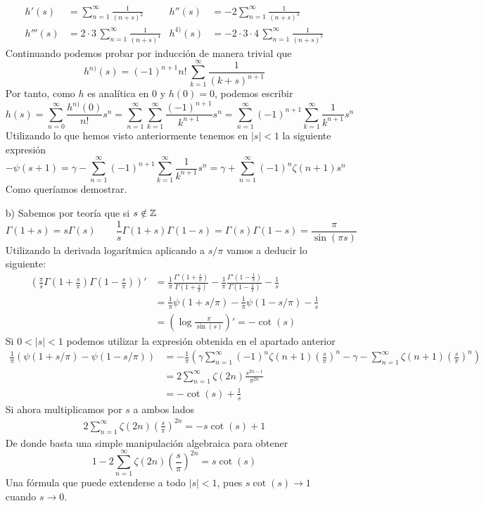 \documentclass[twoside]{article}
\begin{document}
\begin{sol}
\begin{itemize}
\begin{align*}
h'(s) & = \sum_{n=1}^\infty\frac{1}{(n+s)^2} & h''(s)&=  -2\sum_{n=1}^\infty\frac{1}{(n+s)^3}\\
h'''(s) &= 2 \cdot 3 \, \sum_{n=1}^\infty\frac{1}{(n+s)^4} &  h^{4)}(s) &= -2 \cdot 3 \cdot 4 \,\sum_{n=1}^\infty\frac{1}{(n+s)^5}
\end{align*}
Continuando podemos probar por inducción de manera trivial que
$$h^{n)}(s) = (-1)^{n+1}n!\,\sum_{k=1}^\infty\frac{1}{(k+s)^{n+1}}$$
Por tanto, como $h$ es analítica en $0$ y $h(0)=0$, podemos escribir
$$
h(s)=\sum_{n=0}^\infty \frac{h^{n)}(0)}{n!}s^n = \sum_{n=1}^\infty\sum_{k=1}^\infty\frac{(-1)^{n+1}}{k^{n+1}}  s^n = \sum_{n=1}^\infty(-1)^{n+1}\sum_{k=1}^\infty\frac{1}{k^{n+1}}  s^n 
$$
Utilizando lo que hemos visto anteriormente tenemos en $|s|<1$ la siguiente expresión
$$
-\psi(s+1) = \gamma -  \sum_{n=1}^\infty(-1)^{n+1}\sum_{k=1}^\infty\frac{1}{k^{n+1}}  s^n = \gamma + \sum_{n=1}^\infty(-1)^{n}\zeta(n+1) s^n
$$
Como queríamos demostrar.
\newpage
\item[b)] Sabemos por teoría que si $s\notin \mathbb{Z}$
$$\Gamma(1+s)=s\Gamma(s)  \qquad \frac{1}{s}\Gamma(1+s)\Gamma(1-s)= 	\Gamma(s)\Gamma(1-s)=\frac{\pi}{\sin(\pi s)} \qquad 
$$
Utilizando la derivada logarítmica aplicando a $s/\pi$ vamos a deducir lo siguiente:
\begin{align*}
\left(\frac{\pi}{s}\Gamma\left(1+\frac{s}{\pi}\right)\Gamma\left(1-\frac{s}{\pi}\right)\right)' & = \frac{1}{\pi}\frac{\Gamma'\left(1+\frac{s}{\pi}\right)}{\Gamma\left(1+\frac{s}{\pi}\right)} - \frac{1}{\pi}\frac{\Gamma'(1-\frac{1}{\pi})}{\Gamma(1-\frac{1}{\pi})} - \frac{1}{s}\\
 &= \frac{1}{\pi}\psi(1+s/\pi)-\frac{1}{\pi}\psi(1-s/\pi) - \frac{1}{s}\\
&=\left(\log\frac{\pi}{\sin(s)}\right)'  = -\cot(s)
\end{align*}
Si $0<|s|<1$ podemos utilizar la expresión obtenida en el apartado anterior
\begin{align*}
\frac{1}{\pi}\left(\psi(1+s/\pi)-\psi(1-s/\pi)\right) &=  -\frac{1}{\pi}\left(\gamma \sum_{n=1}^\infty(-1)^{n}\zeta(n+1) \left(\frac{s}{\pi}\right)^n -  \gamma - \sum_{n=1}^\infty\zeta(n+1) \left(\frac{s}{\pi}\right)^n\right)\\
&=2\sum_{n=1}^\infty \zeta(2n)\frac{s^{2n-1}}{\pi^{2n}}\\
&=-\cot(s)+\frac{1}{s}
\end{align*}
Si ahora multiplicamos por $s$ a ambos lados
\begin{gather*}
2\sum_{n=1}^\infty \zeta(2n)\left(\frac{s}{\pi}\right)^{2n}=-s\cot(s)+1 
\end{gather*}
De donde basta una simple manipulación algebraica para obtener
$$
1-2\sum_{n=1}^\infty \zeta(2n)\left(\frac{s}{\pi}\right)^{2n}=s\cot(s)
$$
Una fórmula que puede extenderse a todo $|s|<1$, pues $s\cot(s)\to 1$ cuando $s\to 0$.
\end{itemize}
\end{sol}
\newpage
\end{document}
